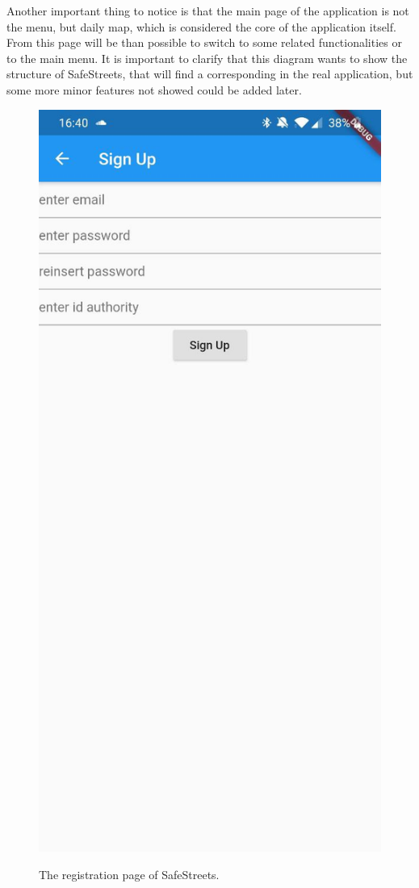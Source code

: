 \documentclass[../RASD.tex]{subfiles}
\begin{document}
    Another important thing to notice is that the main page of the application is not the menu, but daily map, which is considered the core of the application itself.
    From this page will be than possible to switch to some related functionalities or to the main menu.
    It is important to clarify that this diagram wants to show the structure of SafeStreets, that will find a corresponding in the real application,
    but some more minor features not showed could be added later.
    \begin{figure}[H]
        \centering
        \includegraphics[scale = 0.2]{assets/app_screenshots/signup.jpg}\\
        \caption[\textit{Sign Up} Screenshot]{The registration page of SafeStreets.}
    \end{figure}
\end{document}
